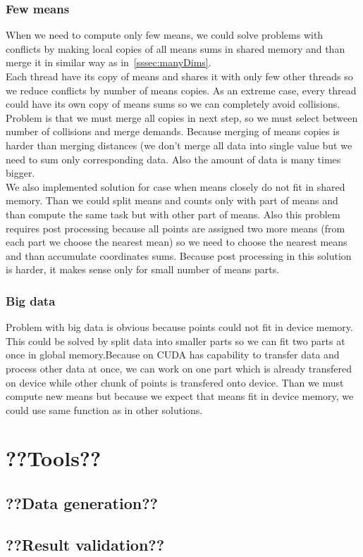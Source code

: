 \subsubsection{Few means}
When we need to compute only few means, we could solve problems with conflicts by making local copies of all means sums in shared memory and than merge it in similar way as in~\autoref{sssec:manyDims}.\\
Each thread have its copy of means and shares it with only few other threads so we reduce conflicts by number of means copies. As an extreme case, every thread could have its own copy of means sums so we can completely avoid collisions. Problem is that we must merge all copies in next step, so we must select between number of collisions and merge demands.
Because merging of means copies is harder than merging distances (we don't merge all data into single value but we need to sum only corresponding data. Also the amount of data is many times bigger.\\
We also implemented solution for case when means closely do not fit in shared memory. Than we could split means and counts only with part of means and than compute the same task but with other part of means. Also this problem requires post processing because all points are assigned two more means (from each part we choose the nearest mean) so we need to choose the nearest means and than accumulate coordinates sums. Because post processing in this solution is harder, it makes sense only for small number of means parts.

\subsubsection{Big data}
Problem with big data is obvious because points could not fit in device memory. This could be solved by split data into smaller parts so we can fit two parts at once in global memory.Because on CUDA has capability to transfer data and process other data at once, we can work on one part which is already transfered on device while other chunk of points is transfered onto device.
Than we must compute new means but because we expect that means fit in device memory, we could use same function as in other solutions.

\section{??Tools??}
\subsection{??Data generation??}
\subsection{??Result validation??}
